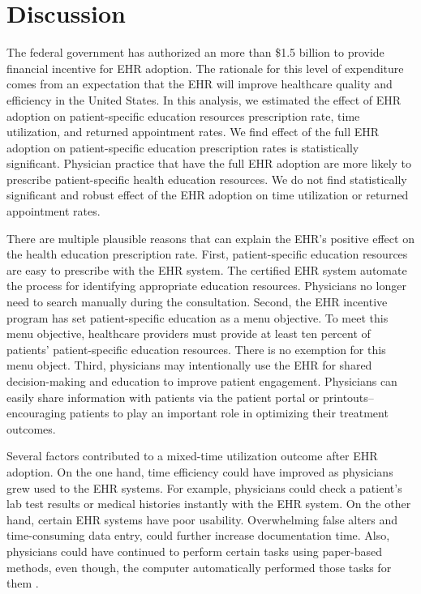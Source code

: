\documentclass[12pt]{report}
\begin{document}
\chapter{Discussion}

The federal government has authorized an more than \$1.5 billion to provide financial incentive for EHR adoption. The rationale for this level of expenditure comes from an expectation that the EHR will improve healthcare quality and efficiency in the United States. In this analysis, we estimated the effect of EHR adoption on patient-specific education resources prescription rate, time utilization, and returned appointment rates. We find effect of the full EHR adoption on patient-specific education prescription rates is statistically significant. Physician practice that have the full EHR adoption are more likely to prescribe patient-specific health education resources. We do not find statistically significant and robust effect of the EHR adoption on time utilization or returned appointment rates.

There are multiple plausible reasons that can explain the EHR's positive effect on the health education prescription rate. First, patient-specific education resources are easy to prescribe with the EHR system. The certified EHR system automate the process for identifying appropriate education resources. Physicians no longer need to search manually during the consultation. Second, the EHR incentive program has set patient-specific education as a menu objective. To meet this menu objective, healthcare providers must provide at least ten percent of patients' patient-specific education resources. There is no exemption for this menu object. Third, physicians may intentionally use the EHR for shared decision-making and education to improve patient engagement. Physicians can easily share information with patients via the patient portal or printouts--encouraging patients to play an important role in optimizing their treatment outcomes.

Several factors contributed to a mixed-time utilization outcome after EHR adoption. On the one hand, time efficiency could have improved as physicians grew used to the EHR systems. For example, physicians could check a patient's lab test results or medical histories instantly with the EHR system. On the other hand, certain EHR systems have poor usability. Overwhelming false alters and time-consuming data entry, could further increase documentation time. Also, physicians could have continued to perform certain tasks using paper-based methods, even though, the computer automatically performed those tasks for them \citep{overhage2001controlled}. 
\end{document}
